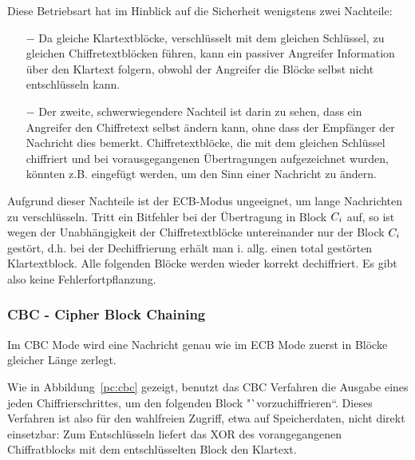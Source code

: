 Diese Betriebsart hat im Hinblick auf die Sicherheit wenigstens zwei Nachteile:

\begin{itemize}
  \item[$-$] Da gleiche Klartextblöcke, verschlüsselt mit dem gleichen Schlüssel, zu gleichen Chiffretextblöcken führen, kann ein passiver Angreifer
  Information über den Klartext folgern, obwohl der Angreifer die Blöcke selbst nicht entschlüsseln kann.
  \item[$-$] Der zweite, schwerwiegendere Nachteil ist darin zu sehen, dass ein Angreifer den Chiffretext selbst ändern kann, ohne dass der Empfänger der
  Nachricht dies bemerkt. Chiffretextblöcke, die mit dem gleichen Schlüssel chiffriert und bei vorausgegangenen Übertragungen aufgezeichnet wurden, könnten
  z.B. eingefügt werden, um den Sinn einer Nachricht zu ändern.
\end{itemize}

Aufgrund dieser Nachteile ist der ECB-Modus ungeeignet, um lange Nachrichten zu verschlüsseln. Tritt ein Bitfehler bei der Übertragung in Block $C_i$ auf, so ist wegen der Unabhängigkeit der Chiffretextblöcke untereinander nur der Block
$C_i$ gestört, d.h. bei der Dechiffrierung erhält man i. allg. einen total gestörten Klartextblock. Alle folgenden Blöcke werden wieder korrekt
dechiffriert. Es gibt also keine Fehlerfortpflanzung.

\subsubsection{CBC - Cipher Block Chaining}
\label{cbc}

Im CBC Mode wird eine Nachricht genau wie im ECB Mode zuerst in Blöcke gleicher Länge zerlegt.

Wie in Abbildung~\ref{pc:cbc} gezeigt, benutzt das CBC Verfahren die Ausgabe eines jeden Chiffrierschrittes, um den folgenden Block "`vorzuchiffrieren``.
Dieses Verfahren ist also für den wahlfreien Zugriff, etwa auf  Speicherdaten, nicht direkt einsetzbar: Zum Entschlüsseln liefert das XOR des vorangegangenen
Chiffratblocks mit dem entschlüsselten Block den Klartext.

